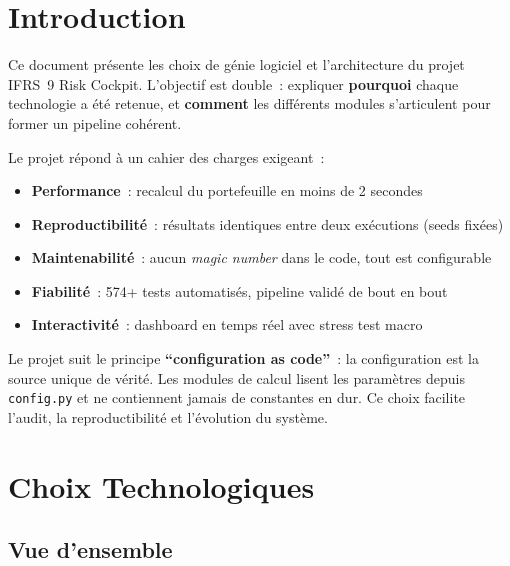 \documentclass[12pt,a4paper]{article}
\begin{document}
\section{Introduction}

Ce document pr\'esente les choix de g\'enie logiciel et l'architecture du projet IFRS~9 Risk Cockpit. L'objectif est double~: expliquer \textbf{pourquoi} chaque technologie a \'et\'e retenue, et \textbf{comment} les diff\'erents modules s'articulent pour former un pipeline coh\'erent.

Le projet r\'epond \`a un cahier des charges exigeant~:
\begin{itemize}[noitemsep]
    \item \textbf{Performance}~: recalcul du portefeuille en moins de 2 secondes
    \item \textbf{Reproductibilit\'e}~: r\'esultats identiques entre deux ex\'ecutions (seeds fix\'ees)
    \item \textbf{Maintenabilit\'e}~: aucun \textit{magic number} dans le code, tout est configurable
    \item \textbf{Fiabilit\'e}~: 574+ tests automatis\'es, pipeline valid\'e de bout en bout
    \item \textbf{Interactivit\'e}~: dashboard en temps r\'eel avec stress test macro
\end{itemize}

\begin{interpretbox}
Le projet suit le principe \textbf{``configuration as code''}~: la configuration est la source unique de v\'erit\'e. Les modules de calcul lisent les param\`etres depuis \texttt{config.py} et ne contiennent jamais de constantes en dur. Ce choix facilite l'audit, la reproductibilit\'e et l'\'evolution du syst\`eme.
\end{interpretbox}


\section{Choix Technologiques}
\label{sec:techno}

\subsection{Vue d'ensemble}
\end{document}
